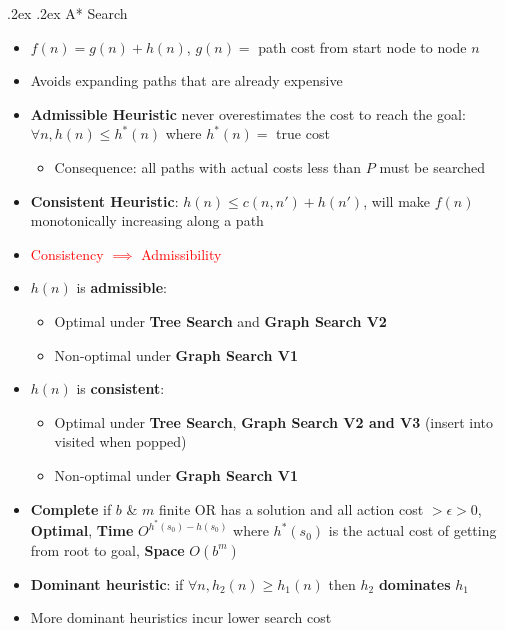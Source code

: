 \documentclass[10pt,landscape,a4paper]{article}
\makeatletter
\renewcommand{\subsubsection}{\@startsection{subsubsection}{1}{0mm}%
	{.2ex}%
	{.2ex}%
	{\rmfamily\bfseries}}
\makeatother
\begin{document}
\begin{multicols*}{4}
  \subsubsection{A* Search}
  \begin{itemize}
    \item $f(n) = g(n) + h(n)$, $g(n) = $ path cost from start node to node $n$
    \item Avoids expanding paths that are already expensive
    \item \textbf{Admissible Heuristic} never overestimates the cost to reach the goal: $\forall n, h(n) \leq h^*(n)$ where $h^*(n) = $ true cost
    \begin{itemize}
    	\item Consequence: all paths with actual costs less than $P$ must be searched
    \end{itemize}
    \item \textbf{Consistent Heuristic}: $h(n) \leq c(n, n') + h(n')$, will make $f(n)$ monotonically increasing along a path
    \item \textcolor{red}{Consistency $\implies$ Admissibility}
    \item $h(n)$ is \textbf{admissible}:
    \begin{itemize}
    	\item Optimal under \textbf{Tree Search} and \textbf{Graph Search V2}
    	\item Non-optimal under \textbf{Graph Search V1}
    \end{itemize}
    \item $h(n)$ is \textbf{consistent}: 
    \begin{itemize}
    	\item Optimal under \textbf{Tree Search}, \textbf{Graph Search V2 and V3} (insert into visited when popped)
    	\item Non-optimal under \textbf{Graph Search V1}
    \end{itemize}
    \item \textbf{Complete} if $b$ \& $m$ finite OR has a solution and all action cost $> \epsilon > 0$, \textbf{Optimal}, \textbf{Time} $O^{h^*(s_0) - h(s_0)}$ where $h^*(s_0)$ is the actual cost of getting from root to goal, \textbf{Space} $O(b^m)$
    \item \textbf{Dominant heuristic}: if $\forall n, h_2(n) \geq h_1(n)$ then $h_2$ \textbf{dominates} $h_1$
    \item More dominant heuristics incur lower search cost
  \end{itemize}


\end{multicols*}
\end{document}
